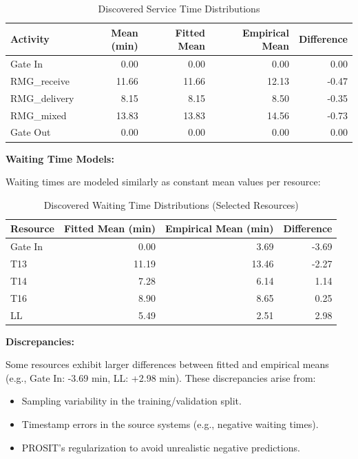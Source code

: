         \begin{table}[h]
        \centering
        \caption{Discovered Service Time Distributions}
        \label{tab:service_distributions}
        \begin{tabular}{lrrrr}
        \toprule
        \textbf{Activity} & \textbf{Mean (min)} & \textbf{Fitted Mean} & \textbf{Empirical Mean} & \textbf{Difference} \\
        \midrule
        Gate In      & 0.00  & 0.00  & 0.00  & 0.00 \\
        RMG\_receive & 11.66 & 11.66 & 12.13 & -0.47 \\
        RMG\_delivery & 8.15 & 8.15 & 8.50 & -0.35 \\
        RMG\_mixed   & 13.83 & 13.83 & 14.56 & -0.73 \\
        Gate Out     & 0.00  & 0.00  & 0.00  & 0.00 \\
        \bottomrule
        \end{tabular}
        \end{table}
        
        \textbf{Waiting Time Models:}
        
        Waiting times are modeled similarly as constant mean values per resource:
        
        \begin{table}[h]
        \centering
        \caption{Discovered Waiting Time Distributions (Selected Resources)}
        \label{tab:waiting_distributions}
        \begin{tabular}{lrrr}
        \toprule
        \textbf{Resource} & \textbf{Fitted Mean (min)} & \textbf{Empirical Mean (min)} & \textbf{Difference} \\
        \midrule
        Gate In    & 0.00  & 3.69  & -3.69 \\
        T13        & 11.19 & 13.46 & -2.27 \\
        T14        & 7.28  & 6.14  & 1.14 \\
        T16        & 8.90  & 8.65  & 0.25 \\
        LL         & 5.49  & 2.51  & 2.98 \\
        \bottomrule
        \end{tabular}
        \end{table}
        
        \textbf{Discrepancies:}
        
        Some resources exhibit larger differences between fitted and empirical means (e.g., Gate In: -3.69 min, LL: +2.98 min). These discrepancies arise from:
        \begin{itemize}
            \item Sampling variability in the training/validation split.
            \item Timestamp errors in the source systems (e.g., negative waiting times).
            \item PROSIT's regularization to avoid unrealistic negative predictions.
        \end{itemize}


